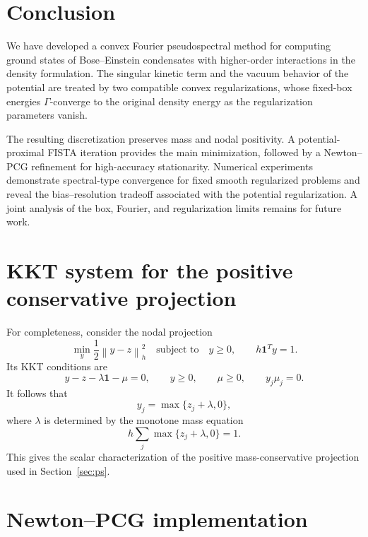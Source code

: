 \documentclass[11pt]{article}
\newcommand{\norm}[1]{\left\|#1\right\|}
\theoremstyle{plain}
\theoremstyle{definition}
\numberwithin{equation}{section}
\begin{document}
\section{Conclusion}
\label{sec:summary}

We have developed a convex Fourier pseudospectral method for computing
ground states of Bose--Einstein condensates with higher-order
interactions in the density formulation. The singular kinetic term and
the vacuum behavior of the potential are treated by two compatible
convex regularizations, whose fixed-box energies $\Gamma$-converge to
the original density energy as the regularization parameters vanish.

The resulting discretization preserves mass and nodal positivity.
A potential-proximal FISTA iteration provides the main minimization,
followed by a Newton--PCG refinement for high-accuracy stationarity.
Numerical experiments demonstrate spectral-type convergence for fixed
smooth regularized problems and reveal the bias--resolution tradeoff
associated with the potential regularization. A joint analysis of the
box, Fourier, and regularization limits remains for future work.
\appendix

\section{KKT system for the positive conservative projection}
\label{app:projection-kkt}

For completeness, consider the nodal projection
\[
\min_y
\frac12\norm{y-z}_h^2
\quad
\text{subject to}
\quad
y\ge0,
\qquad
h\bm1^Ty=1.
\]
Its KKT conditions are
\[
y-z-\lambda\bm1-\mu=0,
\qquad
y\ge0,
\qquad
\mu\ge0,
\qquad
y_j\mu_j=0.
\]
It follows that
\[
y_j=\max\{z_j+\lambda,0\},
\]
where $\lambda$ is determined by the monotone mass equation
\[
h\sum_j\max\{z_j+\lambda,0\}=1.
\]
This gives the scalar characterization of the positive
mass-conservative projection used in Section~\ref{sec:ps}.


\section{Newton--PCG implementation}
\label{app:newton-implementation}
\end{document}
